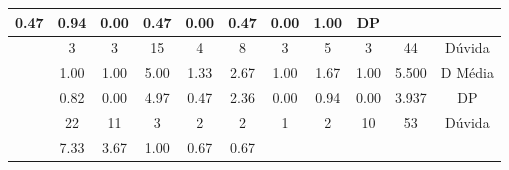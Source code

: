 \begin{table}[htbp]
\begin{tabular}{|ccccccccccc|}
		\multicolumn{1}{c|}{0.47} &
		\multicolumn{1}{c|}{0.94} &
		\multicolumn{1}{c|}{0.00} &
		\multicolumn{1}{c|}{0.47} &
		\multicolumn{1}{c|}{0.00} &
		\multicolumn{1}{c|}{0.47} &
		\multicolumn{1}{c|}{0.00} &
		\multicolumn{1}{c|}{1.00} &
		DP \\ \hline
		\rowcolor[HTML]{D9D9D9} 
		\multicolumn{1}{|c|}{\cellcolor[HTML]{F2F2F2}} &
		\multicolumn{1}{c|}{\cellcolor[HTML]{D9D9D9}3} &
		\multicolumn{1}{c|}{\cellcolor[HTML]{D9D9D9}3} &
		\multicolumn{1}{c|}{\cellcolor[HTML]{D9D9D9}15} &
		\multicolumn{1}{c|}{\cellcolor[HTML]{D9D9D9}4} &
		\multicolumn{1}{c|}{\cellcolor[HTML]{D9D9D9}8} &
		\multicolumn{1}{c|}{\cellcolor[HTML]{D9D9D9}3} &
		\multicolumn{1}{c|}{\cellcolor[HTML]{D9D9D9}5} &
		\multicolumn{1}{c|}{\cellcolor[HTML]{D9D9D9}3} &
		\multicolumn{1}{c|}{\cellcolor[HTML]{D9D9D9}44} &
		Dúvida \\ \cline{2-11} 
		\multicolumn{1}{|c|}{\cellcolor[HTML]{F2F2F2}} &
		\multicolumn{1}{c|}{1.00} &
		\multicolumn{1}{c|}{1.00} &
		\multicolumn{1}{c|}{5.00} &
		\multicolumn{1}{c|}{1.33} &
		\multicolumn{1}{c|}{2.67} &
		\multicolumn{1}{c|}{1.00} &
		\multicolumn{1}{c|}{1.67} &
		\multicolumn{1}{c|}{1.00} &
		\multicolumn{1}{c|}{5.500} &
		D Média \\ \cline{2-11} 
		\rowcolor[HTML]{D9D9D9} 
		\multicolumn{1}{|c|}{\multirow{-3}{*}{\cellcolor[HTML]{F2F2F2}\textbf{T03}}} &
		\multicolumn{1}{c|}{\cellcolor[HTML]{D9D9D9}0.82} &
		\multicolumn{1}{c|}{\cellcolor[HTML]{D9D9D9}0.00} &
		\multicolumn{1}{c|}{\cellcolor[HTML]{D9D9D9}4.97} &
		\multicolumn{1}{c|}{\cellcolor[HTML]{D9D9D9}0.47} &
		\multicolumn{1}{c|}{\cellcolor[HTML]{D9D9D9}2.36} &
		\multicolumn{1}{c|}{\cellcolor[HTML]{D9D9D9}0.00} &
		\multicolumn{1}{c|}{\cellcolor[HTML]{D9D9D9}0.94} &
		\multicolumn{1}{c|}{\cellcolor[HTML]{D9D9D9}0.00} &
		\multicolumn{1}{c|}{\cellcolor[HTML]{D9D9D9}3.937} &
		DP \\ \hline
		\multicolumn{1}{|c|}{\cellcolor[HTML]{F2F2F2}} &
		\multicolumn{1}{c|}{22} &
		\multicolumn{1}{c|}{11} &
		\multicolumn{1}{c|}{3} &
		\multicolumn{1}{c|}{2} &
		\multicolumn{1}{c|}{2} &
		\multicolumn{1}{c|}{1} &
		\multicolumn{1}{c|}{2} &
		\multicolumn{1}{c|}{10} &
		\multicolumn{1}{c|}{53} &
		Dúvida \\ \cline{2-11} 
		\rowcolor[HTML]{D9D9D9} 
		\multicolumn{1}{|c|}{\cellcolor[HTML]{F2F2F2}} &
		\multicolumn{1}{c|}{\cellcolor[HTML]{D9D9D9}7.33} &
		\multicolumn{1}{c|}{\cellcolor[HTML]{D9D9D9}3.67} &
		\multicolumn{1}{c|}{\cellcolor[HTML]{D9D9D9}1.00} &
		\multicolumn{1}{c|}{\cellcolor[HTML]{D9D9D9}0.67} &
		\multicolumn{1}{c|}{\cellcolor[HTML]{D9D9D9}0.67} &

\end{tabular}
\end{table}
